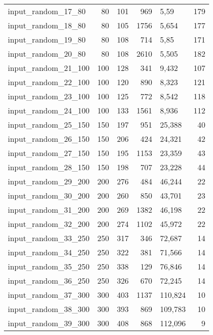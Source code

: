 \begin{longtable}{|l|r|r|r|l|r|}
    input\_random\_17\_80  & 80    & 101   & 969   & 5,59      & 179   \\
    input\_random\_18\_80  & 80    & 105   & 1756  & 5,654     & 177   \\
    input\_random\_19\_80  & 80    & 108   & 714   & 5,85      & 171   \\
    input\_random\_20\_80  & 80    & 108   & 2610  & 5,505     & 182   \\
    input\_random\_21\_100 & 100   & 128   & 341   & 9,432     & 107   \\
    input\_random\_22\_100 & 100   & 120   & 890   & 8,323     & 121   \\
    input\_random\_23\_100 & 100   & 125   & 772   & 8,542     & 118   \\
    input\_random\_24\_100 & 100   & 133   & 1561  & 8,936     & 112   \\
    input\_random\_25\_150 & 150   & 197   & 951   & 25,388    & 40    \\
    input\_random\_26\_150 & 150   & 206   & 424   & 24,321    & 42    \\
    input\_random\_27\_150 & 150   & 195   & 1153  & 23,359    & 43    \\
    input\_random\_28\_150 & 150   & 198   & 707   & 23,228    & 44    \\
    input\_random\_29\_200 & 200   & 276   & 484   & 46,244    & 22    \\
    input\_random\_30\_200 & 200   & 260   & 850   & 43,701    & 23    \\
    input\_random\_31\_200 & 200   & 269   & 1382  & 46,198    & 22    \\
    input\_random\_32\_200 & 200   & 274   & 1102  & 45,972    & 22    \\
    input\_random\_33\_250 & 250   & 317   & 346   & 72,687    & 14    \\
    input\_random\_34\_250 & 250   & 322   & 381   & 71,566    & 14    \\
    input\_random\_35\_250 & 250   & 338   & 129   & 76,846    & 14    \\
    input\_random\_36\_250 & 250   & 326   & 670   & 72,245    & 14    \\
    input\_random\_37\_300 & 300   & 403   & 1137  & 110,824   & 10    \\
    input\_random\_38\_300 & 300   & 393   & 869   & 109,783   & 10    \\
    input\_random\_39\_300 & 300   & 408   & 868   & 112,096   & 9     \\

\end{longtable}
